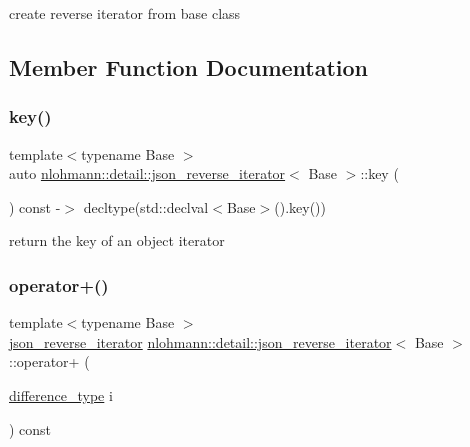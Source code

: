 create reverse iterator from base class 



\subsection{Member Function Documentation}
\mbox{\label{classnlohmann_1_1detail_1_1json__reverse__iterator_adc648a641e8e9a1072c5abd56ad06401}} 
\subsubsection{\texorpdfstring{key()}{key()}}
{\footnotesize\ttfamily template$<$typename Base $>$ \\
auto \mbox{\hyperlink{classnlohmann_1_1detail_1_1json__reverse__iterator}{nlohmann\+::detail\+::json\+\_\+reverse\+\_\+iterator}}$<$ Base $>$\+::key (\begin{DoxyParamCaption}{ }\end{DoxyParamCaption}) const -\/$>$ decltype(std\+::declval$<$Base$>$().key())
    \hspace{0.3cm}{\ttfamily [inline]}}



return the key of an object iterator 

\mbox{\label{classnlohmann_1_1detail_1_1json__reverse__iterator_aabf172b436988e2edde22f13f27caaed}} 
\subsubsection{\texorpdfstring{operator+()}{operator+()}}
{\footnotesize\ttfamily template$<$typename Base $>$ \\
\mbox{\hyperlink{classnlohmann_1_1detail_1_1json__reverse__iterator}{json\+\_\+reverse\+\_\+iterator}} \mbox{\hyperlink{classnlohmann_1_1detail_1_1json__reverse__iterator}{nlohmann\+::detail\+::json\+\_\+reverse\+\_\+iterator}}$<$ Base $>$\+::operator+ (\begin{DoxyParamCaption}\item[{\mbox{\hyperlink{classnlohmann_1_1detail_1_1json__reverse__iterator_a9ab55987c05ec6427ad36082e351cc45}{difference\+\_\+type}}}]{i }\end{DoxyParamCaption}) const\hspace{0.3cm}{\ttfamily [inline]}}



